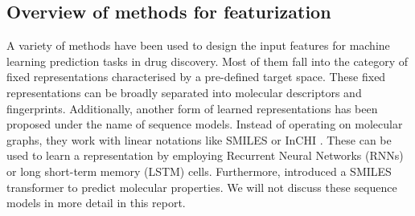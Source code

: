 \subsection{Overview of methods for featurization}
A variety of methods have been used to design the input features for machine learning prediction tasks in drug discovery. Most of them fall into the category of fixed representations characterised by a pre-defined target space. These fixed representations can be broadly separated into molecular descriptors and fingerprints. Additionally, another form of learned representations has been proposed under the name of sequence models. Instead of operating on molecular graphs, they work with linear notations like SMILES \citep{smiles} or InCHI \citep{heller2015inchi}. These can be used to learn a representation by employing Recurrent Neural Networks (RNNs) or long short-term memory (LSTM) cells. Furthermore, \cite{honda} introduced a SMILES transformer to predict molecular properties. We will not discuss these sequence models in more detail in this report.
\label{sec:fixed_rep}

